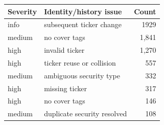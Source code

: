 \begin{tabular}{@{}llr@{}}
\toprule
Severity & Identity/history issue & Count \\
\midrule
info & subsequent ticker change & 1929 \\
medium & no cover tags & 1,841 \\
high & invalid ticker & 1,270 \\
high & ticker reuse or collision & 557 \\
medium & ambiguous security type & 332 \\
high & missing ticker & 317 \\
high & no cover tags & 146 \\
medium & duplicate security resolved & 108 \\
\bottomrule
\end{tabular}
